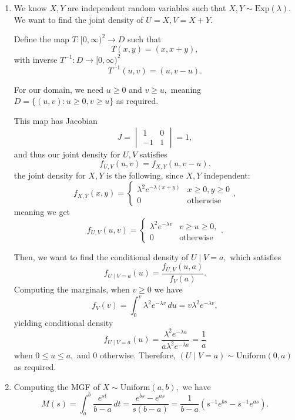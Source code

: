 \documentclass[12pt]{article}
\begin{document}
\begin{enumerate}
  \item We know $X, Y$ are independent random variables such that $X,
    Y \sim \text{Exp}(\lambda).$ We want to find the joint density of
    $U = X, V = X + Y.$

    Define the map $T: \mathbb [0, \infty)^2 \to D$ such that
    $$
    T(x, y) = (x, x + y),
    $$
    with inverse $T^{-1}: D \to [0, \infty)^2$ $$
    T^{-1}(u, v) = (u, v - u).
    $$

    For our domain, we need $u \geq 0$ and $v \geq u,$ meaning $D =
    \{(u, v) : u \geq 0, v \geq u\}$ as required.

    This map has Jacobian $$
    J =
    \begin{vmatrix}
      1 & 0 \\
      -1 & 1
    \end{vmatrix} =  1,
    $$
    and thus our joint density for $U, V$ satisfies
    $$
    f_{U, V}(u, v) = f_{X, Y}(u, v - u).
    $$
    the joint density for $X, Y$ is the following, since $X, Y$ independent:
    $$
    f_{X, Y}(x, y) =
    \begin{cases}
      \lambda^2e^{-\lambda( x + y)} & x \geq 0, y \geq 0 \\
      0 & \text{otherwise}
    \end{cases},
    $$
    meaning we get
    $$
    f_{U, V}(u, v) =
    \begin{cases}
      \lambda^2 e^{-\lambda v} & v \geq u \geq 0,  \\
      0 & \text{otherwise}
    \end{cases}.
    $$

    Then, we want to find the conditional density of $U \mid V = a,$
    which satisfies
    $$
    f_{U \mid V = a}(u) = \dfrac{f_{U, V}(u, a)}{f_V(a)}.
    $$
    Computing the marginals, when $v \geq 0$ we have
    $$
    f_V(v) = \int_{0}^{v} \lambda^2 e^{-\lambda v} \, du = v\lambda^2
    e^{-\lambda v},
    $$
    yielding conditional density $$
    f_{U \mid V = a}(u)  = \dfrac{\lambda^2 e^{-\lambda a}}{a
    \lambda^2 e^{-\lambda a}} = \dfrac{1}{a}
    $$
    when $0 \leq u \leq a,$ and $0$ otherwise. Therefore, $(U \mid V
    = a) \sim \text{Uniform}(0, a)$ as required.

  \item Computing the MGF of $X \sim \text{Uniform}(a, b),$ we have
    $$
    M(s) = \int_{a}^{b} \dfrac{e^{st}}{b - a} \, dt = \dfrac{e^{bs} -
    e^{as}}{s(b- a)} = \dfrac{1}{b-a} (s^{-1}e^{bs} - s^{-1} e^{as}).
    $$


\end{enumerate}
\end{document}
